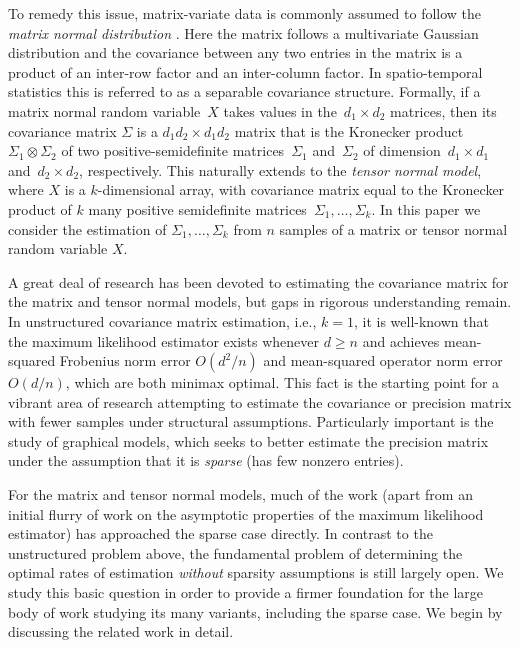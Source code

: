 \documentclass[aos]{imsart}
\theoremstyle{definition}
\numberwithin{equation}{section}
\newcommand{\ot}{\otimes}
\begin{document}
To remedy this issue, matrix-variate data is commonly assumed to follow the \emph{matrix normal distribution} \citep{dutilleul1999mle,werner2008estimation}.
Here the matrix follows a multivariate Gaussian distribution and the covariance between any two entries in the matrix is a product of an inter-row factor and an inter-column factor.
In spatio-temporal statistics this is referred to as a separable covariance structure.
Formally, if a matrix normal random variable~$X$ takes values in the~$d_1\times d_2$ matrices, then its covariance matrix $\Sigma$ is a $d_1d_2\times d_1 d_2$ matrix that is the Kronecker product~$\Sigma_1 \ot \Sigma_2$ of two positive-semidefinite matrices~$\Sigma_1$ and~$\Sigma_2$ of dimension~$d_1\times d_1$ and~$d_2\times d_2$, respectively.
This naturally extends to the \emph{tensor normal model}, where $X$ is a $k$-dimensional array, with covariance matrix equal to the Kronecker product of $k$ many positive semidefinite matrices~$\Sigma_1, \dots, \Sigma_k$.
In this paper we consider the estimation of $\Sigma_1, \dots, \Sigma_k$ from $n$ samples of a matrix or tensor normal random variable $X$.

A great deal of research has been devoted to estimating the covariance matrix for the matrix and tensor normal models, but gaps in rigorous understanding remain. In unstructured covariance matrix estimation, i.e., $k =1$, it is well-known that the maximum likelihood estimator exists whenever $d \geq n$ and achieves mean-squared Frobenius norm error $O(d^2/n)$ and mean-squared operator norm error $O(d/n)$, which are both minimax optimal. This fact is the starting point for a vibrant area of research attempting to estimate the covariance or precision matrix with fewer samples under structural assumptions. Particularly important is the study of graphical models, which seeks to better estimate the precision matrix under the assumption that it is \emph{sparse} (has few nonzero entries).

For the matrix and tensor normal models, much of the work (apart from an initial flurry of work on the asymptotic properties of the maximum likelihood estimator) has approached the sparse case directly. In contrast to the unstructured problem above, the fundamental problem of determining the optimal rates of estimation \emph{without} sparsity assumptions is still largely open. We study this basic question in order to provide a firmer foundation for the large body of work studying its many variants, including the sparse case. We begin by discussing the related work in detail.
\end{document}
